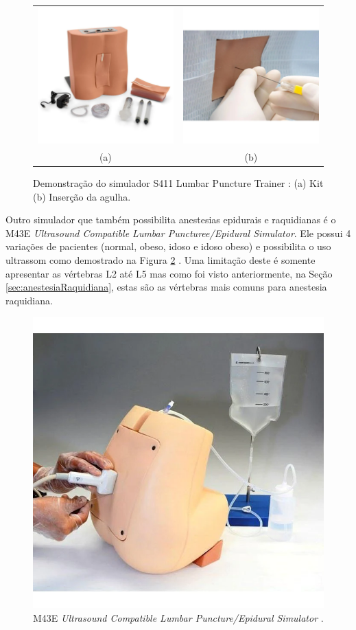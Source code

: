 \begin{figure}[ht!]
    \centering
        \begin{tabular}{cc}
        \includegraphics[width=0.3\linewidth]{capitulos/figuras/S411-Lumbar Puncture Trainer Kit.png} & 
        \includegraphics[width=0.3\linewidth]{capitulos/figuras/S411-Lumbar Puncture Trainer Needle.png} 
        \\
        (a) & (b)
        \end{tabular}
    \caption{Demonstração do simulador S411 Lumbar Puncture Trainer \cite{GaumardScientific}: (a) Kit (b) Inserção da agulha.}
    \label{fig:simuladorS411}
\end{figure}

Outro simulador que também possibilita anestesias epidurais e raquidianas é o M43E \textit{Ultrasound Compatible Lumbar Puncturee/Epidural Simulator}. Ele possui 4 variações de pacientes (normal, obeso, idoso e idoso obeso) e possibilita o uso ultrassom como demostrado na Figura \ref{fig:M43ESimulator} . Uma limitação deste é somente apresentar as vértebras L2 até L5 \cite{KyotoKagaku2015} mas como foi visto anteriormente, na Seção \ref{sec:anestesiaRaquidiana}, estas são as vértebras mais comuns para anestesia raquidiana.

\begin{figure}[ht!]
    \centering
    \includegraphics[width=0.3\linewidth]{capitulos/figuras/M43E Simulator.png} 
    \caption{M43E \textit{Ultrasound Compatible Lumbar Puncture/Epidural Simulator} \cite{KyotoKagaku2015}.}
    \label{fig:M43ESimulator}
\end{figure}

